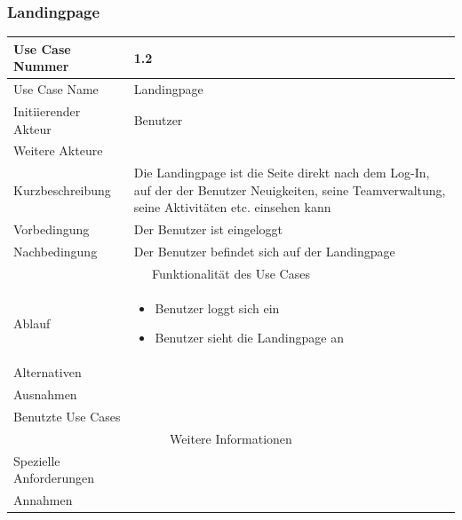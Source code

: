 \documentclass[10pt,a4paper]{article}
\begin{document}
		\subsubsection{Landingpage}
		\begin{tabularx}{\textwidth}{|l|X|}
			\hline Use Case Nummer & 1.2 \\ 
			\hline Use Case Name & Landingpage \\ 
			\hline Initiierender Akteur & Benutzer \\
			\hline Weitere Akteure &  \\
			\hline Kurzbeschreibung & Die Landingpage ist die Seite direkt nach dem Log-In, auf der der Benutzer Neuigkeiten, seine Teamverwaltung, seine Aktivitäten etc. einsehen kann \\
			\hline Vorbedingung & Der Benutzer ist eingeloggt \\
			\hline Nachbedingung & Der Benutzer befindet sich auf der Landingpage \\
			\hline \multicolumn{2}{|c|}{Funktionalität des Use Cases}\\
			\hline Ablauf & \begin{itemize}
				\item Benutzer loggt sich ein
				\item Benutzer sieht die Landingpage an
			\end{itemize} \\
			\hline Alternativen & \\
			\hline Ausnahmen & \\
			\hline Benutzte Use Cases & \\
			\hline \multicolumn{2}{|c|}{Weitere Informationen} \\
			\hline Spezielle Anforderungen & \\
			\hline Annahmen & \\
			\hline
		\end{tabularx}
		
\end{document}
